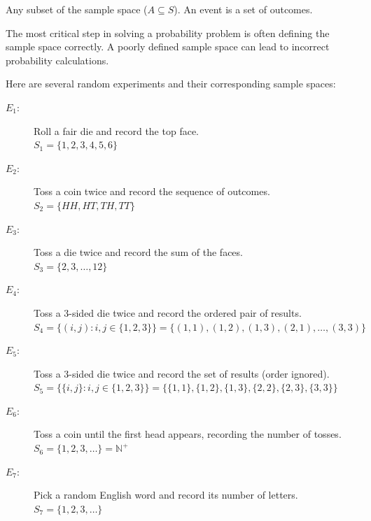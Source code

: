 \begin{definition}[Event]
Any subset of the sample space ($A \subseteq S$). An event is a set of outcomes.
\end{definition}

\begin{remark}
The most critical step in solving a probability problem is often defining the sample space correctly. A poorly defined sample space can lead to incorrect probability calculations.
\end{remark}

\begin{eg}
Here are several random experiments and their corresponding sample spaces:

\begin{description}
    \item[$E_1$:] Roll a fair die and record the top face. \\
    $S_1 = \{1, 2, 3, 4, 5, 6\}$

    \item[$E_2$:] Toss a coin twice and record the sequence of outcomes. \\
    $S_2 = \{HH, HT, TH, TT\}$

    \item[$E_3$:] Toss a die twice and record the sum of the faces. \\
    $S_3 = \{2, 3, \dots, 12\}$

    \item[$E_4$:] Toss a 3-sided die twice and record the ordered pair of results. \\
    $S_4 = \{(i,j) : i,j \in \{1,2,3\}\} = \{(1,1), (1,2), (1,3), (2,1), \dots, (3,3)\}$

    \item[$E_5$:] Toss a 3-sided die twice and record the set of results (order ignored). \\
    $S_5 = \{\{i,j\} : i,j \in \{1,2,3\}\} = \{\{1,1\}, \{1,2\}, \{1,3\}, \{2,2\}, \{2,3\}, \{3,3\}\}$

    \item[$E_6$:] Toss a coin until the first head appears, recording the number of tosses. \\
    $S_6 = \{1, 2, 3, \dots \} = \mathbb{N}^+$

    \item[$E_7$:] Pick a random English word and record its number of letters. \\
    $S_7 = \{1, 2, 3, \dots \}$
\end{description}
\end{eg}
